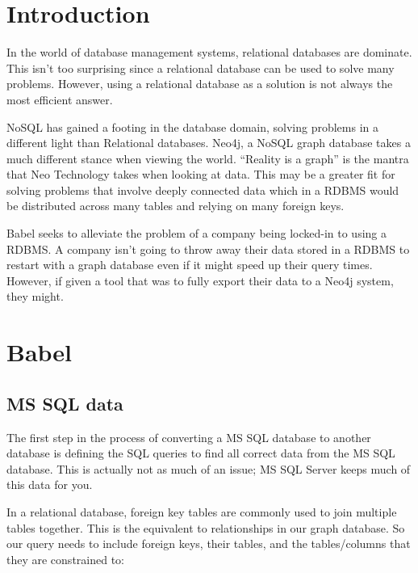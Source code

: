 \documentclass{acm_proc_article-sp}
\begin{document}
\section{Introduction}

In the world of database management systems, relational databases are dominate. This isn't too surprising since a relational database can be used to solve many problems. However, using a relational database as a solution is not always the most efficient answer.

NoSQL has gained a footing in the database domain, solving problems in a different light than Relational databases. Neo4j, a NoSQL graph database takes a much different stance when viewing the world. ``Reality is a graph''\cite{neo4j:neo4j} is the mantra that Neo Technology takes when looking at data. This may be a greater fit for solving problems that involve deeply connected data which in a RDBMS would be distributed across many tables and relying on many foreign keys. 

Babel seeks to alleviate the problem of a company being locked-in to using a RDBMS. A company isn't going to throw away their data stored in a RDBMS to restart with a graph database even if it might speed up their query times. However, if given a tool that was to fully export their data to a Neo4j system, they might.

\section{Babel}

\subsection{MS SQL data}

The first step in the process of converting a MS SQL database to another database is defining the SQL queries to find all correct data from the MS SQL database. This is actually not as much of an issue; MS SQL Server keeps much of this data for you.

In a relational database, foreign key tables are commonly used to join
multiple tables together. This is the equivalent to relationships in
our graph database. So our query needs to include foreign keys, their tables, and the tables/columns that they are constrained to:
\end{document}
